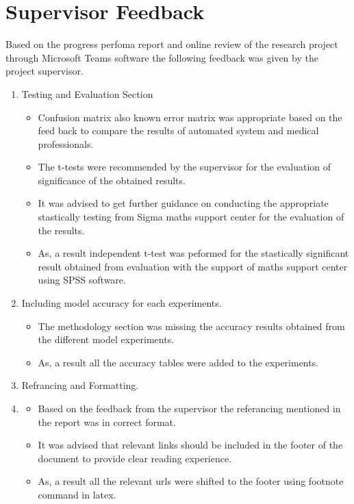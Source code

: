 
\section{Supervisor Feedback}
Based on the progress perfoma report and online review of the research project through Microsoft Teams software the 
following feedback was given by the project supervisor.
\begin{enumerate}
    \item Testing and Evaluation Section
    \begin{itemize}
        \item Confusion matrix also known error matrix was appropriate based on the feed back to compare the 
        results of automated system and medical professionals.
        \item The t-tests were recommended by the supervisor for the evaluation of significance of the 
        obtained results.
        \item It was advised to get further guidance on conducting the appropriate stastically testing from Sigma maths 
        support center for the evaluation of the results.
        \item As, a result independent t-test was peformed for the stastically significant result obtained 
        from evaluation with the support of maths support center using SPSS software.
    \end{itemize}

    \item Including model accuracy for each experiments.
    \begin{itemize}
        \item The methodology section was missing the accuracy results obtained from the different model experiments.
        \item As, a result all the accuracy tables were added to the experiments.
    \end{itemize}

    \item Refrancing and Formatting.
    \item \begin{itemize}
        \item Based on the feedback from the supervisor the referancing mentioned in the report was in correct format.
        \item It was advised that relevant links should be included in the footer of the document to 
        provide clear reading experience.
        \item As, a result all the relevant urls were shifted to the footer using footnote command in latex.
    \end{itemize}

\end{enumerate}
\pagebreak

